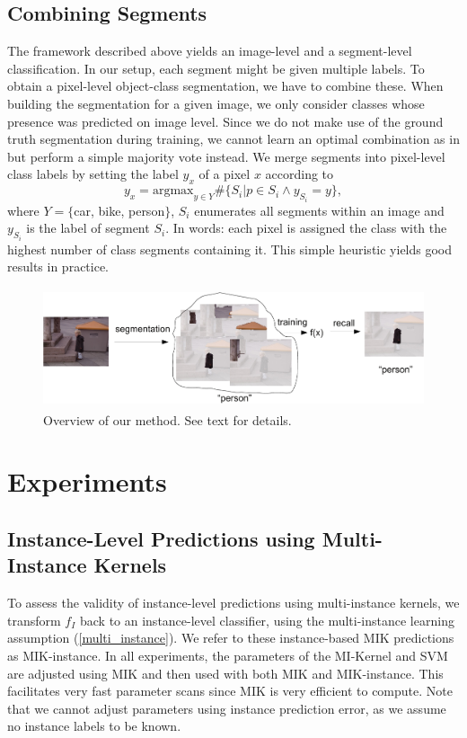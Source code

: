 \subsection{Combining Segments}
The framework described above yields an image-level and a segment-level classification.
In our setup, each segment might be given multiple labels. To obtain a pixel-level object-class segmentation, we have to combine these. 
When building the segmentation for a given image, we only consider classes whose presence was predicted on image level.
Since we do not make use of the ground truth segmentation during training, we cannot learn an optimal combination as 
in \citet{li2010object} but perform a simple majority vote instead.
We merge segments into pixel-level class labels by setting
the label $y_x$ of a pixel $x$ according to
\begin{equation}
    y_x = \text{argmax}_{y \in Y} \#\{S_i | p \in S_i \land y_{S_i}=y \},
\end{equation}
where $Y= \{$car, bike, person$ \}$, $S_i$ enumerates all segments within an
image and $y_{S_i}$ is the label of segment $S_i$. In words: each pixel is
assigned the class with the highest number of class segments containing it.
This simple heuristic yields good results in practice.

\begin{figure}[tbp]
	\begin{center}
        \includegraphics[height=35mm]{images/scheme-crop.pdf}
	\end{center}
        \caption{Overview of our method. See text for details.}
\end{figure}
\section{Experiments}
\subsection{Instance-Level Predictions using Multi-Instance Kernels}
To assess the validity of instance-level predictions using multi-instance kernels, we transform $f_{I}$
back to an instance-level classifier, using the multi-instance learning
assumption (\eqref{multi_instance}). We refer to these instance-based MIK predictions
as MIK-instance. In all experiments, the parameters of the MI-Kernel
and SVM are adjusted using MIK and then used with both MIK and MIK-instance.
This facilitates very fast parameter scans since MIK is very efficient to
compute. Note that we cannot adjust parameters using instance prediction error, as we assume
no instance labels to be known.

